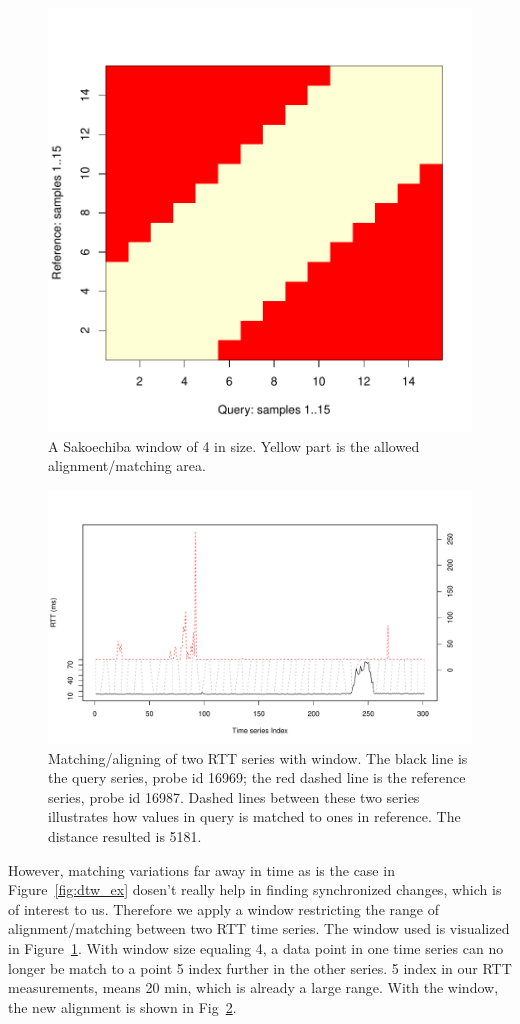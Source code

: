 \begin{figure}[!htb]
\centering
\includegraphics[width=.5\textwidth]{gfx/chap3/win.pdf}
\caption{A Sakoechiba  window \cite{Sakoe1978} of 4 in size. Yellow part is the allowed alignment/matching area.}
\label{fig:win}
\end{figure}

\begin{figure}[!htb]
\centering
\includegraphics[width=.8\textwidth]{gfx/chap3/dtw_ex_win.pdf}
\caption{Matching/aligning of two RTT series with window. The black line is the query series, probe id 16969; the red dashed line is the reference series, probe id 16987. Dashed lines between these two series illustrates how values in query is matched to ones in reference. The distance resulted is 5181.}
\label{fig:dtw_ex_win}
\end{figure}

However, matching variations far away in time as is the case in Figure~\ref{fig:dtw_ex} dosen't really help in finding synchronized changes, which is of interest to us. Therefore we apply a window restricting the range of alignment/matching between two RTT time series. The window used is visualized in Figure~\ref{fig:win}. With window size equaling 4, a data point in one time series can no longer be match to a point 5 index further in the other series. 5 index in our RTT measurements, means 20 min, which is already a large range. With the window, the new alignment is shown in Fig~\ref{fig:dtw_ex_win}.

